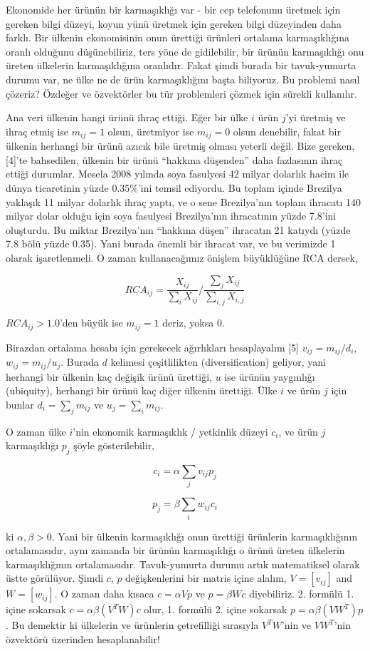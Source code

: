 \documentclass[12pt,fleqn]{article}\usepackage{../../common}
\begin{document}
Ekonomide her ürünün bir karmaşıklığı var - bir cep telefonunu üretmek için
gereken bilgi düzeyi, koyun yünü üretmek için gereken bilgi düzeyinden daha
farklı. Bir ülkenin ekonomisinin onun ürettiği ürünleri ortalama
karmaşıklığına oranlı olduğunu düşünebiliriz, ters yöne de gidilebilir, bir
ürünün karmaşıklığı onu üreten ülkelerin karmaşıklığına oranlıdır. Fakat
şimdi burada bir tavuk-yumurta durumu var, ne ülke ne de ürün
karmaşıklığını başta biliyoruz. Bu problemi nasıl çözeriz? Özdeğer ve
özvektörler bu tür problemleri çözmek için sürekli kullanılır.

Ana veri ülkenin hangi ürünü ihraç ettiği. Eğer bir ülke $i$ ürün $j$'yi
üretmiş ve ihraç etmiş ise $m_{ij}=1$ olsun, üretmiyor ise $m_{ij}=0$ olsun
denebilir, fakat bir ülkenin herhangi bir ürünü azıcık bile üretmiş olması
yeterli değil. Bize gereken, [4]'te bahsedilen, ülkenin bir ürünü ``hakkına
düşenden'' daha fazlasının ihraç ettiği durumlar. Mesela 2008 yılında soya
fasulyesi 42 milyar dolarlık hacim ile dünya ticaretinin yüzde 0.35\%'ini
temsil ediyordu. Bu toplam içinde Brezilya yaklaşık 11 milyar dolarlık
ihraç yaptı, ve o sene Brezilya'nın toplam ihracatı 140 milyar dolar olduğu
için soya fasulyesi Brezilya'nın ihracatının yüzde 7.8'ini oluşturdu. Bu
miktar Brezilya'nın ``hakkına düşen'' ihracatın 21 katıydı (yüzde 7.8 bölü
yüzde 0.35). Yani burada önemli bir ihracat var, ve bu verimizde 1 olarak
işaretlenmeli. O zaman kullanacağımız önişlem büyüklüğüne RCA dersek,

$$
RCA_{ij} = \frac{X_{ij}}{\sum_i X_{ij}} / \frac{\sum_j X_{ij}}{\sum_{i,j} X_{i,j}}
$$

$RCA_{ij} > 1.0$'den büyük ise $m_{ij}=1$ deriz, yoksa 0. 

Birazdan ortalama hesabı için gerekecek ağırlıkları hesaplayalım [5]
$v_{ij} = m_{ij} / d_i$, $w_{ij}=m_{ij}/u_j$. Burada $d$ kelimesi
çeşitlilikten (diversification) geliyor, yani herhangi bir ülkenin kaç
değişik ürünü ürettiği, $u$ ise ürünün yaygınlığı (ubiquity), herhangi bir
ürünü kaç diğer ülkenin ürettiği. Ülke $i$ ve ürün $j$ için bunlar
$d_i = \sum_j m_{ij}$ ve $u_j = \sum_i m_{ij}$.

O zaman ülke $i$'nin ekonomik karmaşıklık / yetkinlik düzeyi $c_i$, ve ürün
$j$ karmaşıklığı $p_j$ şöyle gösterilebilir,

$$
c_i = \alpha \sum_j v_{ij}p_j
$$

$$
p_j  = \beta \sum_i w_{ij} c_i
$$

ki $\alpha,\beta>0$. Yani bir ülkenin karmaşıklığı onun ürettiği ürünlerin
karmaşıklığının ortalamasıdır, aynı zamanda bir ürünün karmaşıklığı o ürünü
üreten ülkelerin karmaşıklığının ortalamasıdır. Tavuk-yumurta durumu artık
matematiksel olarak üstte görülüyor. Şimdi $c$, $p$ değişkenlerini bir
matris içine alalım, $V=[v_{ij}]$ and $W=[w_{ij}]$. O zaman daha kısaca
$c = \alpha V p$ ve $p = \beta W c$ diyebiliriz. 2. formülü 1. içine
sokarsak $c = \alpha \beta (V^T W) c $ olur, 1. formülü 2. içine sokarsak
$p = \alpha \beta (V W^T) p$. Bu demektir ki ülkelerin ve ürünlerin
çetrefilliği sırasıyla $V^T W$'nin ve $V W^T$'nin özvektörü üzerinden
hesaplanabilir!
\end{document}
